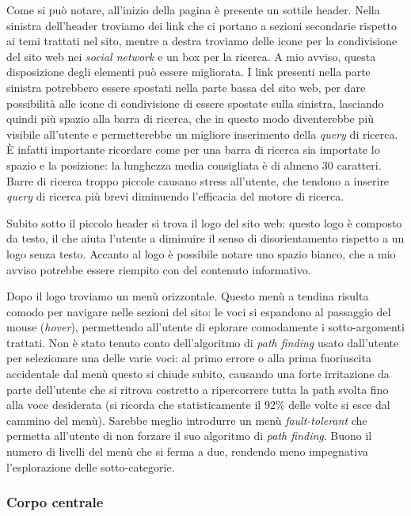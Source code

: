 Come si pu\`o notare, all'inizio della pagina \`e presente un sottile header. Nella sinistra dell'header troviamo dei link che ci portano a sezioni secondarie rispetto ai temi trattati nel sito, mentre a destra troviamo delle icone per la condivisione del sito web nei \textit{social network} e un box per la ricerca.
A mio avviso, questa disposizione degli elementi pu\`o essere migliorata. I link presenti nella parte sinistra potrebbero essere spostati nella parte bassa del sito web, per dare possibilit\`a alle icone di condivisione di essere spostate sulla sinistra, lasciando quindi pi\`u spazio alla barra di ricerca, che in questo modo diventerebbe pi\`u visibile all'utente e permetterebbe un migliore inserimento della \textit{query} di ricerca. \`E infatti importante ricordare come per una barra di ricerca sia importate lo spazio e la posizione: la lunghezza media consigliata \`e di almeno 30 caratteri. Barre di ricerca troppo piccole causano stress all'utente, che tendono a inserire \textit{query} di ricerca pi\`u brevi diminuendo l'efficacia del motore di ricerca.


Subito sotto il piccolo header si trova il logo del sito web: questo logo \`e composto da testo, il che aiuta l'utente a diminuire il senso di disorientamento rispetto a un logo senza testo.
Accanto al logo \`e possibile notare uno spazio bianco, che a mio avviso potrebbe essere riempito con del contenuto informativo.


Dopo il logo troviamo un men\`u orizzontale. Questo men\`u a tendina risulta comodo per navigare nelle sezioni del sito: le voci si espandono al passaggio del mouse (\textit{hover}), permettendo all'utente di eplorare comodamente i sotto-argomenti trattati. Non \`e stato tenuto conto dell'algoritmo di \textit{path finding} usato dall'utente per selezionare una delle varie voci: al primo errore o alla prima fuoriuscita accidentale dal men\`u questo si chiude subito, causando una forte irritazione da parte dell'utente che si ritrova costretto a ripercorrere tutta la path svolta fino alla voce desiderata (si ricorda che statisticamente il 92\% delle volte si esce dal cammino del men\`u). Sarebbe meglio introdurre un men\`u \textit{fault-tolerant} che permetta all'utente di non forzare il suo algoritmo di \textit{path finding}. Buono il numero di livelli del men\`u che si ferma a due, rendendo meno impegnativa l'esplorazione delle sotto-categorie.

\subsubsection{Corpo centrale}

